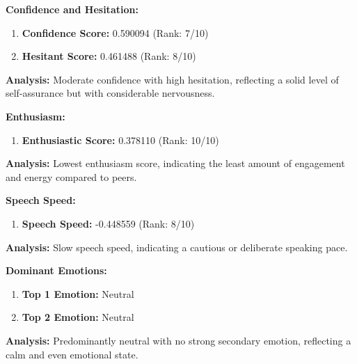 \documentclass{article}
\begin{document}
\large{\textbf{Confidence and Hesitation:}}
\begin{tcolorbox}[ colback=purple!5!white,colframe=purple!75!black,  title=Confidence and Hesitant Scores]
    \begin{enumerate}
        \item \textbf{Confidence Score:} \textcolor{green!50!black}{0.590094} (Rank: 7/10)
        \item \textbf{Hesitant Score:} \textcolor{red!70!black}{0.461488} (Rank: 8/10)
    \end{enumerate}
\end{tcolorbox}
    \textbf{Analysis:} Moderate confidence with high hesitation, reflecting a solid level of self-assurance but with considerable nervousness.

\large{\textbf{Enthusiasm:}}
\begin{tcolorbox}[title=Enthusiastic Score]
    \begin{enumerate}
        \item \textbf{Enthusiastic Score:} \textcolor{orange!70!black}{0.378110} (Rank: 10/10)
    \end{enumerate}
\end{tcolorbox}
    \textbf{Analysis:} Lowest enthusiasm score, indicating the least amount of engagement and energy compared to peers.

\large{\textbf{Speech Speed:}}
\begin{tcolorbox}[ colback=purple!5!white,colframe=purple!75!black,  title=Speech Speed]
    \begin{enumerate}
        \item \textbf{Speech Speed:} \textcolor{purple!70!black}{-0.448559} (Rank: 8/10)
    \end{enumerate}
\end{tcolorbox}
    \textbf{Analysis:} Slow speech speed, indicating a cautious or deliberate speaking pace.

\large{\textbf{Dominant Emotions:}}
\begin{tcolorbox}[colback=red!5!white,colframe=red!75!black,title=Emotional State]
    \begin{enumerate}
        \item \textbf{Top 1 Emotion:} \textcolor{blue!80!black}{Neutral}
        \item \textbf{Top 2 Emotion:} \textcolor{red!80!black}{Neutral}
    \end{enumerate}
\end{tcolorbox}
    \textbf{Analysis:} Predominantly neutral with no strong secondary emotion, reflecting a calm and even emotional state.
\end{document}
